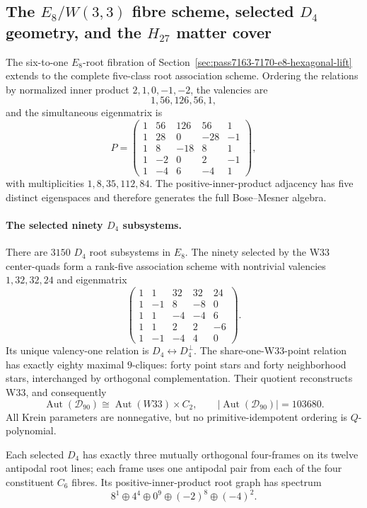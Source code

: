 \subsection{The $E_8/W(3,3)$ fibre scheme, selected $D_4$ geometry, and the $H_{27}$ matter cover}
\label{sec:pass7171-7186-e8-d4-h27-q9}

The six-to-one $E_8$-root fibration of Section~\ref{sec:pass7163-7170-e8-hexagonal-lift} extends to the complete five-class root association scheme.  Ordering the relations by normalized inner product $2,1,0,-1,-2$, the valencies are
\[
  \boxed{1,56,126,56,1},
\]
and the simultaneous eigenmatrix is
\[
P=\begin{pmatrix}
1&56&126&56&1\\
1&28&0&-28&-1\\
1&8&-18&8&1\\
1&-2&0&2&-1\\
1&-4&6&-4&1
\end{pmatrix},
\]
with multiplicities $1,8,35,112,84$.  The positive-inner-product adjacency has five distinct eigenspaces and therefore generates the full Bose--Mesner algebra.

\paragraph{The selected ninety $D_4$ subsystems.}
There are $3150$ $D_4$ root subsystems in $E_8$.  The ninety selected by the W33 center-quads form a rank-five association scheme with nontrivial valencies $1,32,32,24$ and eigenmatrix
\[
\begin{pmatrix}
1&1&32&32&24\\
1&-1&8&-8&0\\
1&1&-4&-4&6\\
1&1&2&2&-6\\
1&-1&-4&4&0
\end{pmatrix}.
\]
Its unique valency-one relation is $D_4\leftrightarrow D_4^\perp$.  The share-one-W33-point relation has exactly eighty maximal $9$-cliques: forty point stars and forty neighborhood stars, interchanged by orthogonal complementation.  Their quotient reconstructs W33, and consequently
\[
  \boxed{\operatorname{Aut}(\mathcal D_{90})\cong\operatorname{Aut}(W33)\times C_2},
  \qquad |\operatorname{Aut}(\mathcal D_{90})|=103680.
\]
All Krein parameters are nonnegative, but no primitive-idempotent ordering is $Q$-polynomial.

Each selected $D_4$ has exactly three mutually orthogonal four-frames on its twelve antipodal root lines; each frame uses one antipodal pair from each of the four constituent $C_6$ fibres.  Its positive-inner-product root graph has spectrum
\[
  \boxed{8^1\oplus4^4\oplus0^9\oplus(-2)^8\oplus(-4)^2}.
\]

